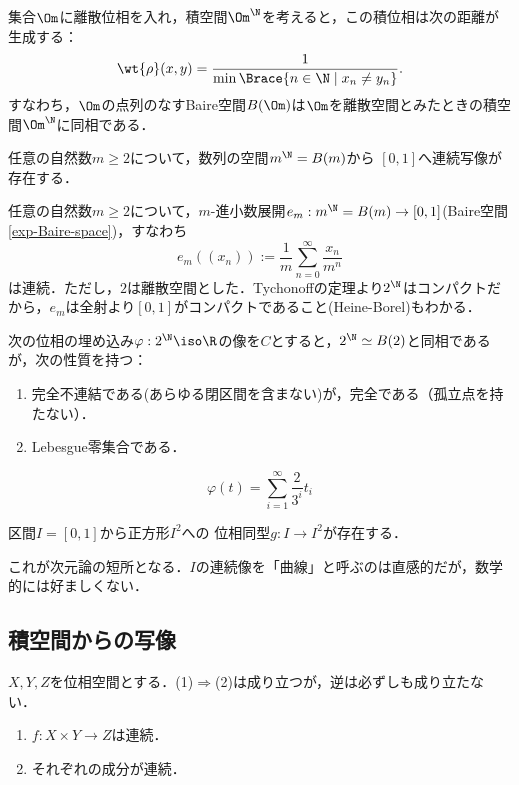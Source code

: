 \documentclass[uplatex,dvipdfmx]{jsreport}
\begin{document}
\begin{proposition}
    集合$\Om$に離散位相を入れ，積空間$\Om^\N$を考えると，この積位相は次の距離が生成する：
    \[\wt{\rho}(x,y)=\frac{1}{\min\Brace{n\in\N\mid x_n\ne y_n}}.\]
    すなわち，$\Om$の点列のなすBaire空間$B(\Om)$は$\Om$を離散空間とみたときの積空間$\Om^\N$に同相である．
\end{proposition}

\begin{theorem}
    任意の自然数$m\ge2$について，数列の空間$m^\N=B(m)$から
    $[0,1]$へ連続写像が存在する．
\end{theorem}
\begin{example}[$m$-進小数展開]
    任意の自然数$m\ge 2$について，$m$-進小数展開$e_m:m^\N=B(m)\to[0,1]$(Baire空間\ref{exp-Baire-space})，すなわち
    \[e_m((x_n)):=\frac{1}{m}\sum^\infty_{n=0}\frac{x_n}{m^n}\]
    は連続．ただし，$2$は離散空間とした．Tychonoffの定理より$2^\N$はコンパクトだから，$e_m$は全射より$[0,1]$がコンパクトであること(Heine-Borel)もわかる．
\end{example}

\begin{proposition}[Cantor集合]
    次の位相の埋め込み$\varphi:2^\N\iso\R$の像を$C$とすると，$2^\N\simeq B(2)$と同相であるが，次の性質を持つ：
    \begin{enumerate}
        \item 完全不連結である(あらゆる閉区間を含まない)が，完全である（孤立点を持たない）．
        \item Lebesgue零集合である．
    \end{enumerate}
    \[\varphi(t)=\sum_{i=1}^\infty\frac{2}{3^i}t_i\]
\end{proposition}

\begin{proposition}[Peano (1890)]
    区間$I=[0,1]$から正方形$I^2$への
    位相同型$g:I\to I^2$が存在する．
\end{proposition}
\begin{remark}
    これが次元論の短所となる．$I$の連続像を「曲線」と呼ぶのは直感的だが，数学的には好ましくない．
\end{remark}

\subsection{積空間からの写像}

\begin{proposition}
    $X,Y,Z$を位相空間とする．(1)$\Rightarrow$(2)は成り立つが，逆は必ずしも成り立たない．
    \begin{enumerate}
        \item $f:X\times Y\to Z$は連続．
        \item それぞれの成分が連続．
    \end{enumerate}
\end{proposition}
\end{document}
